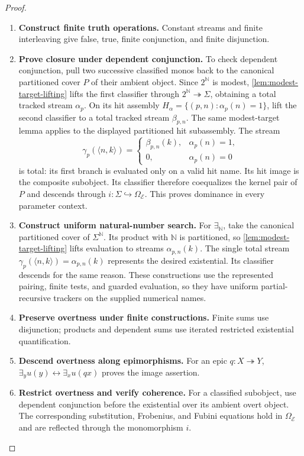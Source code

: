 \documentclass[11pt,a4paper]{article}
\numberwithin{algorithm}{section}
\numberwithin{equation}{section}
\theoremstyle{definition}
\theoremstyle{remark}
\theoremstyle{plain}
\newcommand{\E}{\mathcal E}
\newcommand{\Truth}{\Omega_{\E}}
\newcommand{\N}{\mathbb N}
\newcommand{\incl}{\hookrightarrow}
\newcommand{\onto}{\twoheadrightarrow}
\theoremstyle{definition}
\theoremstyle{plain}
\begin{document}
\begin{proof}\leavevmode
\begin{enumerate}[leftmargin=*,align=left]
\item \textbf{Construct finite truth operations.}
Constant streams and finite interleaving give false, true, finite
conjunction, and finite disjunction.

\item \textbf{Prove closure under dependent conjunction.}
To check dependent conjunction,
pull two successive classified monos back to the canonical partitioned
cover $P$ of their ambient object. Since $2^\N$ is modest,
\cref{lem:modest-target-lifting} lifts the first classifier through
$2^\N\onto\Sigma$, obtaining a total tracked stream $\alpha_p$.
On its hit assembly
$H_\alpha=\{(p,n):\alpha_p(n)=1\}$, lift the second classifier to
a total tracked stream $\beta_{p,n}$. The same modest-target lemma
applies to the displayed partitioned hit subassembly. The stream
\[
 \gamma_p(\langle n,k\rangle)=
 \begin{cases}
 \beta_{p,n}(k),&\alpha_p(n)=1,\\
 0,&\alpha_p(n)=0
 \end{cases}
\]
is total: its first branch is evaluated only on a valid hit name.
Its hit image is the composite subobject. Its classifier therefore
coequalizes the kernel pair of $P$ and descends through
$i:\Sigma\incl\Truth$. This proves dominance in every parameter context.

\item \textbf{Construct uniform natural-number search.}
For $\exists_\N$, take the canonical partitioned cover of $\Sigma^\N$.
Its product with $\N$ is partitioned, so \cref{lem:modest-target-lifting}
lifts evaluation to streams $\alpha_{p,n}(k)$.
The single total stream
$\gamma_p(\langle n,k\rangle)=\alpha_{p,n}(k)$ represents the desired
existential. Its classifier descends for the same reason. These
constructions use the represented pairing, finite tests, and guarded
evaluation, so they have uniform partial-recursive trackers on the
supplied numerical names.

\item \textbf{Preserve overtness under finite constructions.}
Finite sums use disjunction; products and dependent sums use iterated
restricted existential quantification.

\item \textbf{Descend overtness along epimorphisms.}
For an epic $q:X\onto Y$,
$\exists_yu(y)\leftrightarrow\exists_xu(qx)$ proves the image assertion.

\item \textbf{Restrict overtness and verify coherence.}
For a classified subobject, use dependent conjunction before the
existential over its ambient overt object. The corresponding
substitution, Frobenius, and Fubini equations hold in $\Truth$ and
are reflected through the monomorphism $i$.
\end{enumerate}
\end{proof}
\end{document}

